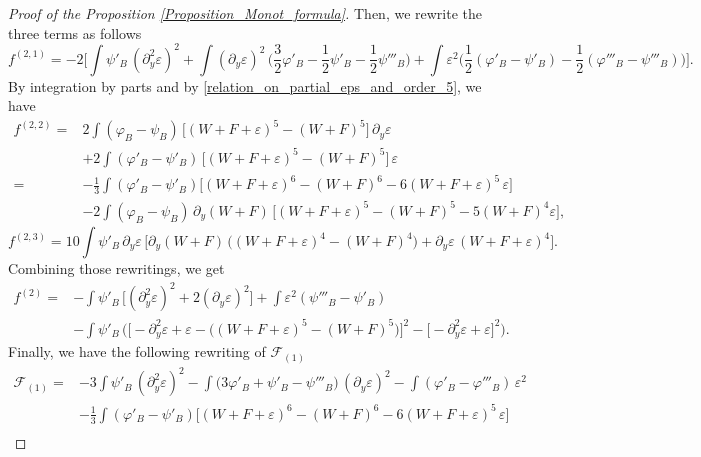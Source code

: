 \documentclass[16pt,english, oneside,reqno]{smfart}
\newcommand{\vare}{{\varepsilon}}
\newcommand{\vphi}{{\varphi}}
\begin{document}
\begin{proof}[Proof of the Proposition \ref{Proposition_Monot_formula}]
Then, we rewrite the three terms as follows
\begin{equation}
    f^{(2,1)} = -2 \Big[\int \psi'_B \, (\partial^2_y \vare )^2  + \int (\partial_y \vare)^2 \,\big( \frac{3}{2}\vphi'_B - \frac{1}{2}\psi'_B - \frac{1}{2}\psi'''_B \big) + \int \vare^2 \big( \frac{1}{2}(\vphi'_B-\psi'_B)-\frac{1}{2}(\vphi'''_B - \psi'''_B) \big) \Big]. 
\end{equation}
By integration by parts and by \eqref{relation_on_partial_eps_and_order_5}, we have
\begin{equation}
\begin{split}
    f^{(2,2)} 
    = &2 \int (\vphi_B - \psi_B)\, \big[ (W+F+\vare)^5 - (W+F)^5 \big]\, \partial_y \vare\\
    &+ 2 \int (\vphi'_B -\psi'_B)\,\big[(W+F+\vare)^5 - (W+F)^5 \big]\, \vare\\
    = & -\frac{1}{3}\int (\vphi'_B - \psi'_B) \big[ (W+F+\vare)^6 - (W+F)^6 - 6 (W+F+\vare)^5 \,\vare \big]\\
    & -2 \int (\vphi_B - \psi_B)\, \partial_y (W+F)\, \big[ (W+F+\vare)^5 - (W+F)^5 - 5 (W+F)^4 \vare \big],
\end{split}
\end{equation}
\begin{equation}
    f^{(2,3)} = 10 \int \psi'_B \, \partial_y \vare \, \Big[ \partial_y (W+F)\, \big( (W+F+\vare)^4 - (W+F)^4 \big) + \partial_y \vare \, (W+F+\vare)^4 \Big].
\end{equation}
Combining those rewritings, we get
\begin{equation}
\begin{split}
    f^{(2)} 
    = & - \int \psi'_B \, \big[ (\partial^2_y \vare)^2 + 2 (\partial_y \vare)^2  \big] + \int \vare^2 (\psi'''_B - \psi'_B)\\
    & - \int \psi'_B \, \Big( \big[-\partial^2_y \vare + \vare - \big((W+F+\vare)^5 - (W+F)^5 \big) \big]^2 - \big[-\partial^2_y \vare + \vare \big]^2 \Big).
\end{split}
\end{equation}
Finally, we have the following rewriting of $\mathcal{F}_{(1)}$
\begin{equation}
    \begin{split}
        \mathcal{F}_{(1)} = 
        & -3 \int \psi'_B \, (\partial^2_y \vare)^2  - \int \big( 3\vphi'_B + \psi'_B - \psi'''_B \big)\, (\partial_y \vare)^2 - \int (\vphi'_B - \vphi'''_B)\, \vare^2\\
        & -\frac{1}{3}\int (\vphi'_B - \psi'_B) \big[ (W+F+\vare)^6 - (W+F)^6 - 6 (W+F+\vare)^5\,\vare \big]\\

\end{split}
\end{equation}
\end{proof}
\end{document}
